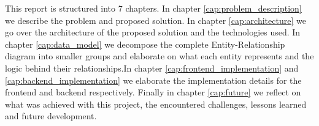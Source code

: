 This report is structured into 7 chapters. In chapter \ref{cap:problem_description} we describe the problem and proposed solution. In chapter \ref{cap:architecture} we go over the architecture of the proposed solution and the technologies used. In chapter \ref{cap:data_model} we decompose the complete Entity-Relationship diagram into smaller groups and elaborate on what each entity represents and the logic behind their relationships.In chapter \ref{cap:frontend_implementation} and \ref{cap:backend_implementation} we elaborate the implementation details for the frontend and backend respectively. Finally in chapter \ref{cap:future} we reflect on what was achieved with this project, the encountered challenges, lessons learned and future development.
%
%
%
%
%
%
%
%
%
%
%
